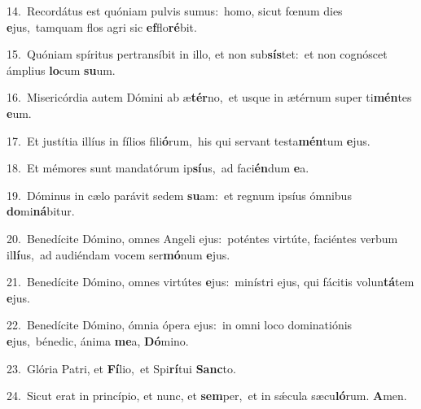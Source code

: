 {\numbfont\textcolor{\numbcolor}{14.}}~Recordátus est quóniam pulvis sumus:~\dagger homo, sicut fœnum dies \textbf{e}\-jus,~\star tamquam flos agri sic \textbf{ef}\-flo\-\textbf{ré}\-bit.\par
{\numbfont\textcolor{\numbcolor}{15.}}~Quóniam spíritus pertransíbit in illo, et non sub\-\textbf{sís}\-tet:~\star et non cognóscet ámplius \textbf{lo}\-cum \textbf{su}\-um.\par
{\numbfont\textcolor{\numbcolor}{16.}}~Misericórdia autem Dómini ab æ\-\textbf{tér}\-no,~\star et usque in ætérnum super ti\-\textbf{mén}\-tes \textbf{e}\-um.\par
{\numbfont\textcolor{\numbcolor}{17.}}~Et justítia illíus in fílios fili\-\textbf{ó}\-rum,~\star his qui servant testa\-\textbf{mén}\-tum \textbf{e}\-jus.\par
{\numbfont\textcolor{\numbcolor}{18.}}~Et mémores sunt mandatórum ip\-\textbf{sí}\-us,~\star ad faci\-\textbf{én}\-dum \textbf{e}\-a.\par
{\numbfont\textcolor{\numbcolor}{19.}}~Dóminus in cælo parávit sedem \textbf{su}\-am:~\star et regnum ipsíus ómnibus \textbf{do}\-mi\-\textbf{ná}\-bitur.\par
{\numbfont\textcolor{\numbcolor}{20.}}~Benedícite Dómino, omnes Angeli ejus:~\dagger poténtes virtúte, faciéntes verbum il\-\textbf{lí}\-us,~\star ad audiéndam vocem ser\-\textbf{mó}\-num \textbf{e}\-jus.\par
{\numbfont\textcolor{\numbcolor}{21.}}~Benedícite Dómino, omnes virtútes \textbf{e}\-jus:~\star minístri ejus, qui fácitis volun\-\textbf{tá}\-tem \textbf{e}\-jus.\par
{\numbfont\textcolor{\numbcolor}{22.}}~Benedícite Dómino, ómnia ópera ejus:~\dagger in omni loco dominatiónis \textbf{e}\-jus,~\star bénedic, ánima \textbf{me}\-a, \textbf{Dó}\-mino.\par
{\numbfont\textcolor{\numbcolor}{23.}}~Glória Patri, et \textbf{Fí}\-lio,~\star et Spi\-\textbf{rí}\-tui \textbf{Sanc}\-to.\par
{\numbfont\textcolor{\numbcolor}{24.}}~Sicut erat in princípio, et nunc, et \textbf{sem}\-per,~\star et in sǽcula sæcu\-\textbf{ló}\-rum. \textbf{A}\-men.\par

